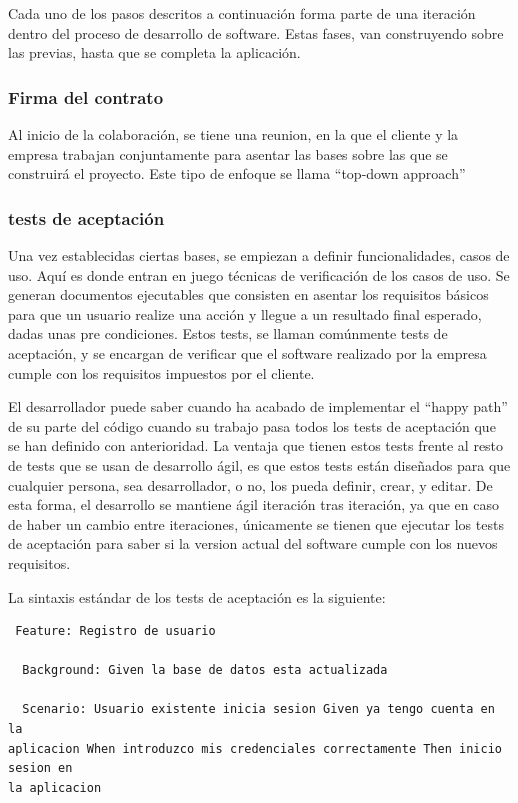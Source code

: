 \documentclass[12pt]{report} %
\begin{document}
Cada uno de los pasos descritos a continuación forma parte de una iteración
dentro del proceso de desarrollo de software.  Estas fases, van construyendo
sobre las previas, hasta que se completa la aplicación.

\subsubsection{Firma del contrato}

Al inicio de la colaboración, se tiene una reunion, en la que el cliente y la
empresa trabajan conjuntamente para asentar las bases sobre las que se
construirá el proyecto.  Este tipo de enfoque se llama ``top-down approach''

\subsubsection{tests de aceptación}

Una vez establecidas ciertas bases, se empiezan a definir funcionalidades, casos
de uso.  Aquí es donde entran en juego técnicas de verificación de los casos de
uso.  Se generan documentos ejecutables que consisten en asentar los requisitos
básicos para que un usuario realize una acción y llegue a un resultado final
esperado, dadas unas pre condiciones.  Estos tests, se llaman comúnmente tests
de aceptación, y se encargan de verificar que el software realizado por la
empresa cumple con los requisitos impuestos por el cliente.

El desarrollador puede saber cuando ha acabado de implementar el ``happy path''
de su parte del código cuando su trabajo pasa todos los tests de aceptación que
se han definido con anterioridad.  La ventaja que tienen estos tests frente al
resto de tests que se usan de desarrollo ágil, es que estos tests están
diseñados para que cualquier persona, sea desarrollador, o no, los pueda
definir, crear, y editar.  De esta forma, el desarrollo se mantiene ágil
iteración tras iteración, ya que en caso de haber un cambio entre iteraciones,
únicamente se tienen que ejecutar los tests de aceptación para saber si la
version actual del software cumple con los nuevos requisitos.

La sintaxis estándar de los tests de aceptación es la siguiente:

\begin{lstlisting} Feature: Registro de usuario

  Background: Given la base de datos esta actualizada

  Scenario: Usuario existente inicia sesion Given ya tengo cuenta en la
aplicacion When introduzco mis credenciales correctamente Then inicio sesion en
la aplicacion \end{lstlisting}
\end{document}
